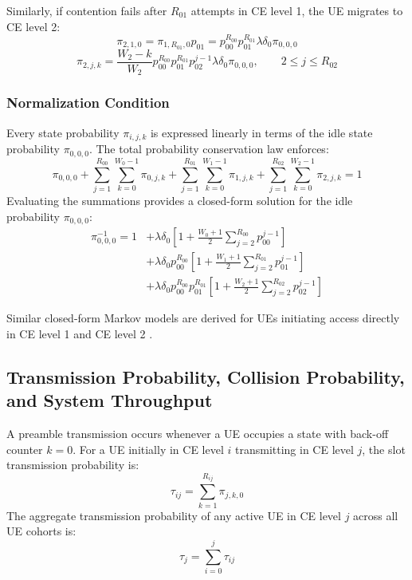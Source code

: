 Similarly, if contention fails after $R_{01}$ attempts in CE level 1, the UE migrates to CE level 2:
\begin{equation}
    \pi_{2,1,0} = \pi_{1, R_{01}, 0} p_{01} = p_{00}^{R_{00}} p_{01}^{R_{01}} \lambda \delta_0 \pi_{0,0,0}
\end{equation}
\begin{equation}
    \pi_{2,j,k} = \frac{W_2 - k}{W_2} p_{00}^{R_{00}} p_{01}^{R_{01}} p_{02}^{j-1} \lambda \delta_0 \pi_{0,0,0}, \qquad 2 \le j \le R_{02}
\end{equation}

\subsubsection{Normalization Condition}
Every state probability $\pi_{i,j,k}$ is expressed linearly in terms of the idle state probability $\pi_{0,0,0}$. The total probability conservation law enforces:
\begin{equation}
    \label{eq:nbiot_normalization}
    \pi_{0,0,0} + \sum_{j=1}^{R_{00}} \sum_{k=0}^{W_0-1} \pi_{0,j,k} + \sum_{j=1}^{R_{01}} \sum_{k=0}^{W_1-1} \pi_{1,j,k} + \sum_{j=1}^{R_{02}} \sum_{k=0}^{W_2-1} \pi_{2,j,k} = 1
\end{equation}
Evaluating the summations provides a closed-form solution for the idle probability $\pi_{0,0,0}$:
\begin{align}
    \pi_{0,0,0}^{-1} = 1 &+ \lambda \delta_0 \left[ 1 + \frac{W_0 + 1}{2} \sum_{j=2}^{R_{00}} p_{00}^{j-1} \right] \nonumber \\
    &+ \lambda \delta_0 p_{00}^{R_{00}} \left[ 1 + \frac{W_1 + 1}{2} \sum_{j=2}^{R_{01}} p_{01}^{j-1} \right] \nonumber \\
    &+ \lambda \delta_0 p_{00}^{R_{00}} p_{01}^{R_{01}} \left[ 1 + \frac{W_2 + 1}{2} \sum_{j=2}^{R_{02}} p_{02}^{j-1} \right]
\end{align}

Similar closed-form Markov models are derived for UEs initiating access directly in CE level 1 and CE level 2 \cite{ramineni2022performance}.

\subsection{Transmission Probability, Collision Probability, and System Throughput}
A preamble transmission occurs whenever a UE occupies a state with back-off counter $k = 0$. For a UE initially in CE level $i$ transmitting in CE level $j$, the slot transmission probability is:
\begin{equation}
    \tau_{ij} = \sum_{k=1}^{R_{ij}} \pi_{j, k, 0}
\end{equation}
The aggregate transmission probability of any active UE in CE level $j$ across all UE cohorts is:
\begin{equation}
    \tau_j = \sum_{i=0}^j \tau_{ij}
\end{equation}

